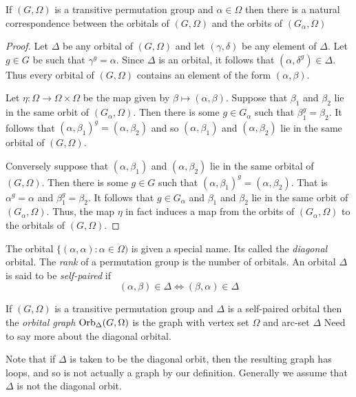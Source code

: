 \begin{lemma} 
If $(G,\Omega)$ is a transitive permutation group
and $\alpha \in \Omega$
then there is a natural correspondence between the orbitals of $(G,\Omega)$
and the orbits of $(G_\alpha,\Omega)$ 
\begin{proof}
Let $\Delta$ be any orbital of $(G,\Omega)$
and let $(\gamma,\delta)$ be any element of $\Delta$.
Let $g \in G$ be such that $\gamma^g = \alpha$.
Since $\Delta$ is an orbital, it follows that
$(\alpha,\delta^g) \in \Delta$.
Thus every orbital of $(G,\Omega)$ contains an element
of the form $(\alpha,\beta)$.

Let $\eta : \Omega \to \Omega \times \Omega$ be the map given by
$\beta \mapsto (\alpha, \beta)$. 
Suppose that $\beta_1$ and $\beta_2$
lie in the same orbit of $(G_\alpha,\Omega)$.
Then there is some $g \in G_\alpha$ such that $\beta_1^g = \beta_2$.
It follows that $(\alpha,\beta_1)^g = (\alpha,\beta_2)$
and so $(\alpha,\beta_1)$ and $(\alpha,\beta_2)$ lie in the same
orbital of $(G,\Omega)$.

Conversely suppose that $(\alpha,\beta_1)$ and $(\alpha,\beta_2)$
lie in the same orbital of $(G,\Omega)$.
Then there is some $g \in G$ such that $(\alpha,\beta_1)^g = (\alpha,\beta_2)$.
That is $\alpha^g = \alpha$ and $\beta_1^g = \beta_2$.
It follows that $g \in G_\alpha$ and $\beta_1$ and $\beta_2$
lie in the same orbit of $(G_\alpha, \Omega)$.
Thus, the map $\eta$ in fact induces a map from the orbits of $(G_\alpha,\Omega)$
to the orbitals of $(G,\Omega)$.
\end{proof}
\end{lemma}

The orbital $\{ (\alpha,\alpha) : \alpha \in \Omega)$
is given a special name. Its called the {\it diagonal} orbital.
The {\it rank} of a permutation group is the number of orbitals.
An orbital $\Delta$ is said to be {\it self-paired} if
$$ (\alpha, \beta) \in \Delta \Longleftrightarrow
   (\beta, \alpha) \in \Delta $$

\begin{definition} 
If $(G,\Omega)$ is a transitive permutation group and
$\Delta$ is a self-paired orbital 
then the {\it orbital graph} $\operatorname{Orb}_\Delta(G, \Omega)$
is the graph with vertex set $\Omega$ and arc-set $\Delta$
Need to say more about the diagonal orbital.
\end{definition}

Note that if $\Delta$ is taken to be the diagonal orbit,
then the resulting graph has loops, and so is not actually
a graph by our definition. Generally we assume that $\Delta$
is not the diagonal orbit.


